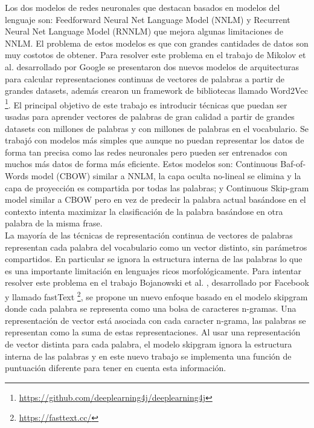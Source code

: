 \documentclass[spanish,12pt, a4paper,twoside]{paper}
\begin{document}
Los dos modelos de redes neuronales que destacan basados en modelos del lenguaje son: Feedforward Neural Net Language Model (NNLM) \cite{bengio:2003} y Recurrent Neural Net Language Model (RNNLM) que mejora algunas limitaciones de NNLM. El problema de estos modelos es que con grandes cantidades de datos son muy costotos de obtener. Para resolver este problema en el trabajo de Mikolov et al. \cite{mikolov:2013} desarrollado por Google se presentaron dos nuevos modelos de arquitecturas para calcular representaciones continuas de vectores de palabras a partir de grandes datasets, además crearon un framework de bibliotecas llamado Word2Vec \footnote{\url{https://github.com/deeplearning4j/deeplearning4j}}. El principal objetivo de este trabajo es introducir técnicas que puedan ser usadas para aprender vectores de palabras de gran calidad a partir de grandes datasets con millones de palabras y con millones de palabras en el vocabulario. Se trabajó con modelos más simples que aunque no puedan representar los datos de forma tan precisa como las redes neuronales pero pueden ser entrenados con muchos más datos de forma más eficiente. Estos modelos son: Continuous Baf-of-Words model (CBOW) similar a NNLM, la capa oculta no-lineal se elimina y la capa de proyección es compartida por todas las palabras; y Continuous Skip-gram model similar a CBOW pero en vez de predecir la palabra actual basándose en el contexto intenta maximizar la clasificación de la palabra basándose en otra palabra de la misma frase.\\

La mayoría de las técnicas de representación continua de vectores de palabras representan cada palabra del vocabulario como un vector distinto, sin parámetros compartidos. En particular se ignora la estructura interna de las palabras lo que es una importante limitación en lenguajes ricos morfológicamente. Para intentar resolver este problema en el trabajo Bojanowski et al. \cite{bojanowski:2017}, desarrollado por Facebook y llamado fastText \footnote{\url{https://fasttext.cc/}}, se propone un nuevo enfoque basado en el modelo skipgram \cite{mikolov:2013} donde cada palabra se representa como una bolsa de caracteres n-gramas. Una representación de vector está asociada con cada caracter n-grama, las palabras se representan como la suma de estas representaciones. Al usar una representación de vector distinta para cada palabra, el modelo skipgram ignora la estructura interna de las palabras y en este nuevo trabajo se implementa una función de puntuación diferente para tener en cuenta esta información.
\end{document}
